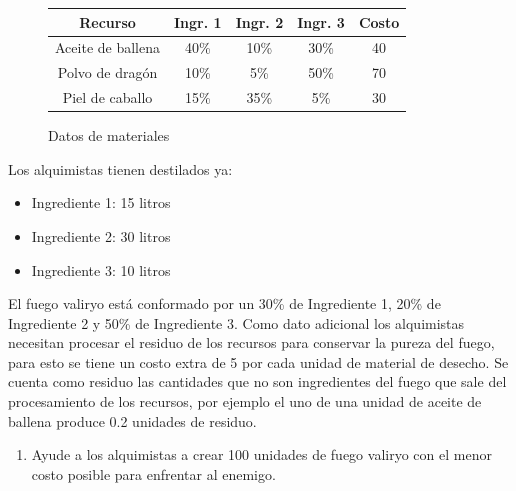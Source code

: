 \documentclass[a4paper,10pt,twocolumn]{article}
\theoremstyle{theorem}
\theoremstyle{definition}
\theoremstyle{remark}
\begin{document}
\begin{figure}[h!]%
	\begin{center}
		\begin{tabular}{|c|c|c|c|c|} \hline
		Recurso				& Ingr. 1 & Ingr. 2 	& Ingr. 3   & Costo  \\ \hline
		Aceite de ballena	& 40\%			& 10\%				& 30\%			  & 40		\\ \hline
		Polvo de dragón		& 10\%			&  5\%				& 50\%	  		  & 70		\\ \hline
		Piel de caballo		& 15\%			& 35\%				&  5\%	  		  & 30		\\ \hline
		\end{tabular}
	\caption{Datos de materiales}\label{fig:ejer_3}
	\end{center}
\end{figure}

Los alquimistas tienen destilados ya:

\begin{itemize}

	\item Ingrediente 1: 15 litros
	\item Ingrediente 2: 30 litros
	\item Ingrediente 3: 10 litros

\end{itemize}

El fuego valiryo está conformado por un 30\% de Ingrediente 1, 20\% de Ingrediente 2 y 50\% de Ingrediente 3. Como dato adicional los alquimistas necesitan procesar el residuo de los recursos para conservar la pureza del fuego, para esto se tiene un costo extra de 5 por cada unidad de material de desecho. Se cuenta como residuo las cantidades que no son ingredientes del fuego que sale del procesamiento de los recursos, por ejemplo el uno de una unidad de aceite de ballena produce 0.2 unidades de residuo.

\renewcommand{\theenumi}{\alph{enumi}} %

\begin{enumerate}

	\item Ayude a los alquimistas a crear 100 unidades de fuego valiryo con el menor costo posible para enfrentar al enemigo.

\end{enumerate}

\end{document}
